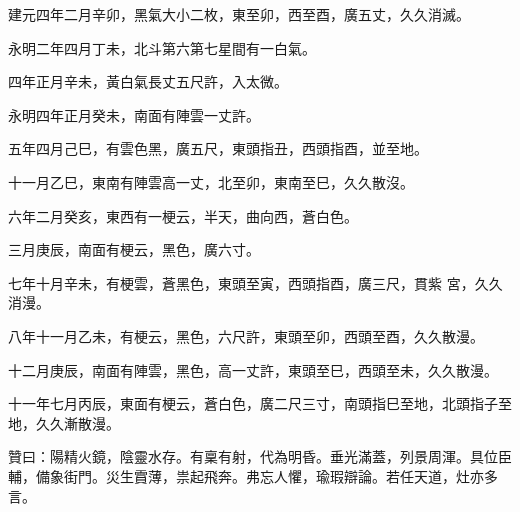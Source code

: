 \begin{pinyinscope}
 建元四年二月辛卯，黑氣大小二枚，東至卯，西至酉，廣五丈，久久消滅。



 永明二年四月丁未，北斗第六第七星間有一白氣。



 四年正月辛未，黃白氣長丈五尺許，入太微。



 永明四年正月癸未，南面有陣雲一丈許。



 五年四月己巳，有雲色黑，廣五尺，東頭指丑，西頭指酉，並至地。



 十一月乙巳，東南有陣雲高一丈，北至卯，東南至巳，久久散沒。



 六年二月癸亥，東西有一梗云，半天，曲向西，蒼白色。



 三月庚辰，南面有梗云，黑色，廣六寸。



 七年十月辛未，有梗雲，蒼黑色，東頭至寅，西頭指酉，廣三尺，貫紫
 宮，久久消漫。



 八年十一月乙未，有梗云，黑色，六尺許，東頭至卯，西頭至酉，久久散漫。



 十二月庚辰，南面有陣雲，黑色，高一丈許，東頭至巳，西頭至未，久久散漫。



 十一年七月丙辰，東面有梗云，蒼白色，廣二尺三寸，南頭指巳至地，北頭指子至地，久久漸散漫。



 贊曰：陽精火鏡，陰靈水存。有稟有射，代為明昏。垂光滿蓋，列景周渾。具位臣輔，備象街門。災生霣薄，祟起飛奔。弗忘人懼，瑜瑕辯論。若任天道，灶亦多言。



\end{pinyinscope}